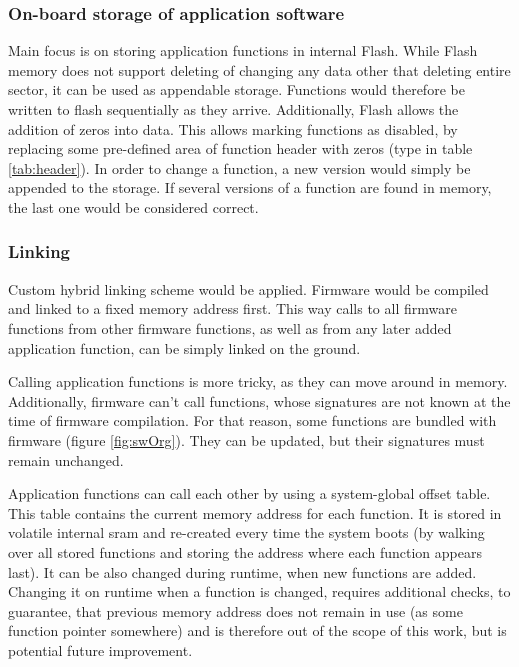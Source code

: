 \subsubsection{On-board storage of application software}

Main focus is on storing application functions in internal Flash. While Flash memory does not support deleting of changing any data other that deleting entire sector, it can be used as appendable storage. Functions would therefore be written to flash sequentially as they arrive. Additionally, Flash allows the addition of zeros into data. This allows marking functions as disabled, by replacing some pre-defined area of function header with zeros (type in table \ref{tab:header}). In order to change a function, a new version would simply be appended to the storage. If several versions of a function are found in memory, the last one would be considered correct.

\subsubsection{Linking}

Custom hybrid linking scheme would be applied. Firmware would be compiled and linked to a fixed memory address first. This way calls to all firmware functions from other firmware functions, as well as from any later added application function, can be simply linked on the ground.

Calling application functions is more tricky, as they can move around in memory. Additionally, firmware can't call functions, whose signatures are not known at the time of firmware compilation. For that reason, some functions are bundled with firmware (figure \ref{fig:swOrg}). They can be updated, but their signatures must remain unchanged.

Application functions can call each other by using a system-global offset table. This table contains the current memory address for each function. It is stored in volatile internal \gls{sram} and re-created every time the system boots (by walking over all stored functions and storing the address where each function appears last). It can be also changed during runtime, when new functions are added. Changing it on runtime when a function is changed, requires additional checks, to guarantee, that previous memory address does not remain in use (as some function pointer somewhere) and is therefore out of the scope of this work, but is potential future improvement.

